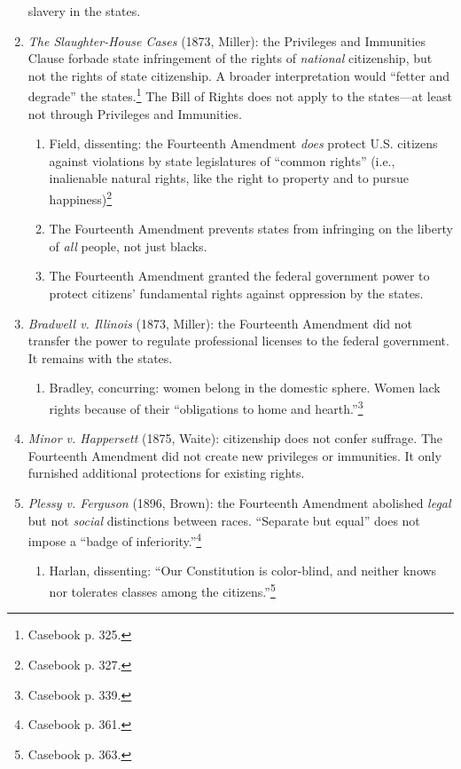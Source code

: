 \begin{enumerate}
    slavery in the states.
    \item \emph{The Slaughter-House Cases} (1873, Miller): the Privileges and 
    Immunities Clause forbade state infringement of the rights of 
    \emph{national} citizenship, but not the rights of state citizenship. A 
    broader interpretation would ``fetter and degrade'' the 
    states.\footnote{Casebook p. 325.} The Bill of Rights does not apply to 
    the states---at least not through Privileges and Immunities.
    \begin{enumerate}
        \item Field, dissenting: the Fourteenth Amendment \emph{does} protect 
        U.S. citizens against violations by state legislatures of ``common 
        rights'' (i.e., inalienable natural rights, like the right to property 
        and to pursue happiness)\footnote{Casebook p. 327.}
        \item The Fourteenth Amendment prevents states from infringing on the 
        liberty of \emph{all} people, not just blacks.
        \item The Fourteenth Amendment granted the federal government power to 
        protect citizens' fundamental rights against oppression by the states.
    \end{enumerate}
    \item \emph{Bradwell v. Illinois} (1873, Miller): the Fourteenth Amendment 
    did not transfer the power to regulate professional licenses to the 
    federal government. It remains with the states.
    \begin{enumerate}
        \item Bradley, concurring: women belong in the domestic sphere. Women 
        lack rights because of their ``obligations to home and 
        hearth.''\footnote{Casebook p. 339.}
    \end{enumerate}
    \item \emph{Minor v. Happersett} (1875, Waite): citizenship does not 
    confer suffrage. The Fourteenth Amendment did not create new privileges or 
    immunities. It only furnished additional protections for existing rights.
    \item \emph{Plessy v. Ferguson} (1896, Brown): the Fourteenth Amendment 
    abolished \emph{legal} but not \emph{social} distinctions between races.  
    ``Separate but equal'' does not impose a ``badge of 
    inferiority.''\footnote{Casebook p. 361.}
    \begin{enumerate}
        \item Harlan, dissenting: ``Our Constitution is color-blind, 
        and neither knows nor tolerates classes among the 
        citizens.''\footnote{Casebook p. 363.}
    \end{enumerate}
\end{enumerate}

